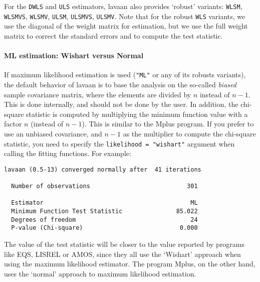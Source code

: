 For the \texttt{DWLS} and \texttt{ULS} estimators, lavaan also provides
`robust' variants: \texttt{WLSM}, \texttt{WLSMVS}, \texttt{WLSMV},
\texttt{ULSM}, \texttt{ULSMVS}, \texttt{ULSMV}. Note that for the robust
\texttt{WLS} variants, we use the diagonal of the weight matrix for
estimation, but we use the full weight matrix to correct the standard
errors and to compute the test statistic.

\paragraph{ML estimation: Wishart versus Normal}

If maximum likelihood estimation is used (\texttt{"ML"} or any of its
robusts variants), the default behavior of lavaan is to base the
analysis on the so-called \emph{biased} sample covariance matrix, where
the elements are divided by $n$ instead of $n-1$. This is done
internally, and should not be done by the user. In addition, the
chi-square statistic is computed by multiplying the minimum function
value with a factor $n$ (instead of $n-1$). This is similar to the Mplus
program. If you prefer to use an unbiased covariance, and $n-1$ as the
multiplier to compute the chi-square statistic, you need to specify the
\texttt{likelihood = "wishart"} argument when calling the fitting
functions. For example:

\begin{Shaded}
\begin{Highlighting}[]
\StringTok{ }
            
            \NormalTok{)}
\end{Highlighting}
\end{Shaded}

\begin{verbatim}
lavaan (0.5-13) converged normally after  41 iterations

  Number of observations                           301

  Estimator                                         ML
  Minimum Function Test Statistic               85.022
  Degrees of freedom                                24
  P-value (Chi-square)                           0.000
\end{verbatim}

The value of the test statistic will be closer to the value reported by
programs like EQS, LISREL or AMOS, since they all use the `Wishart'
approach when using the maximum likelihood estimator. The program Mplus,
on the other hand, uses the `normal' approach to maximum likelihood
estimation.

